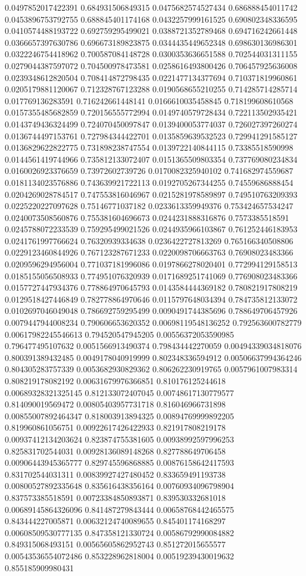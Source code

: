 \begin{table}
\begin{tabu}
\begin{sparkline}{10}
0.0497852017422391 0.684931506849315 0.0475682574527434 0.686888454011742 0.0453896753792755 0.688845401174168 0.0432257999161525 0.690802348336595 0.0410574488193722 0.692759295499021 0.0388721352789468 0.694716242661448 0.0366657397630786 0.696673189823875 0.0344435449652348 0.698630136986301 0.0322246754418962 0.700587084148728 0.0300353636651588 0.702544031311155 0.0279044387597072 0.704500978473581 0.0258616493800426 0.706457925636008 0.0239348612820504 0.708414872798435 0.0221477134377694 0.710371819960861 0.0205179881120067 0.712328767123288 0.0190568655210255 0.714285714285714 0.017769136283591 0.716242661448141 0.0166610035458845 0.718199608610568 0.0157355485682859 0.720156555772994 0.0149740579728434 0.722113502935421 0.0143749436324499 0.724070450097847 0.0139400053774037 0.726027397260274 0.0136744497153761 0.727984344422701 0.0135859639532523 0.729941291585127 0.0136829622822775 0.731898238747554 0.0139722140844115 0.73385518590998 0.0144561419744966 0.735812133072407 0.0151365509803354 0.737769080234834 0.0160026923376659 0.73972602739726 0.0170082325940102 0.741682974559687 0.0181134023576886 0.743639921722113 0.0192705267344255 0.74559686888454 0.0204269028784517 0.747553816046967 0.0215281978589897 0.749510763209393 0.0225220227097628 0.75146771037182 0.0233613359949376 0.753424657534247 0.0240073508560876 0.755381604696673 0.0244231888316876 0.7573385518591 0.0245788072233539 0.759295499021526 0.0244935966103867 0.761252446183953 0.0241761997766624 0.76320939334638 0.0236422727813269 0.765166340508806 0.0229123460844926 0.767123287671233 0.0220098706663763 0.76908023483366 0.0209596294956004 0.771037181996086 0.0197866278020401 0.772994129158513 0.0185155056508933 0.774951076320939 0.0171689251741069 0.776908023483366 0.0157727447934376 0.778864970645793 0.0143584444369182 0.780821917808219 0.0129518427446849 0.782778864970646 0.0115797648034394 0.784735812133072 0.0102697046049048 0.786692759295499 0.0090491744385696 0.788649706457926 0.0079447944008234 0.790606653620352 0.00698119548136252 0.792563600782779 0.00617982245546613 0.794520547945205 0.00556372053590985 0.796477495107632 0.0051566913490374 0.798434442270059 0.00494339034818076 0.800391389432485 0.0049178040919999 0.802348336594912 0.00506637994364246 0.804305283757339 0.0053682930829362 0.806262230919765 0.0057961007983314 0.808219178082192 0.00631679976366851 0.810176125244618 0.00689328321325145 0.812133072407045 0.00748617130779577 0.814090019569472 0.00805403957731718 0.816046966731898 0.00855007892464347 0.818003913894325 0.00894769999892205 0.819960861056751 0.00922617426422933 0.821917808219178 0.00937412134203624 0.823874755381605 0.00938992597996253 0.825831702544031 0.00928136089148268 0.827788649706458 0.00906443945365777 0.829745596868885 0.00876158642417593 0.831702544031311 0.00839927427480452 0.833659491193738 0.00800527892335648 0.835616438356164 0.00760934096798904 0.837573385518591 0.00723384850893871 0.839530332681018 0.00689145864326096 0.841487279843444 0.00658768442465575 0.843444227005871 0.00632124740089655 0.845401174168297 0.00608509530777135 0.847358121330724 0.00586792990084882 0.849315068493151 0.00565605862952743 0.851272015655577 0.00543536554072486 0.853228962818004 0.00519239430019632 0.855185909980431 
\end{sparkline}
\end{tabu}
\end{table}
